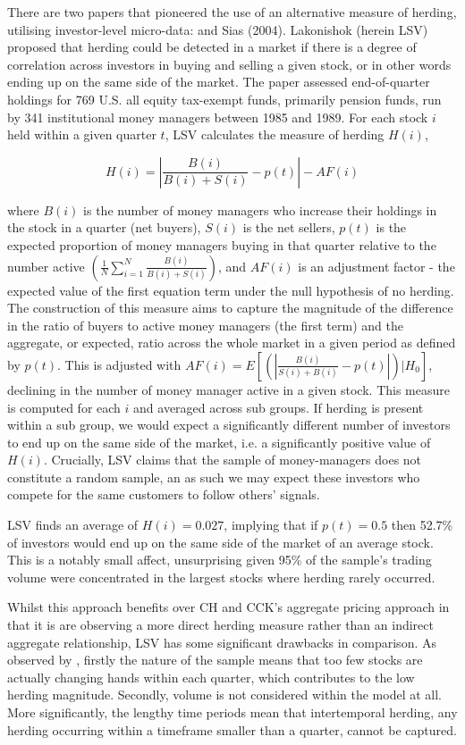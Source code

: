 \documentclass[12pt]{article}
\numberwithin{table}{section}   %
\begin{document}
There are two papers that pioneered the use of an alternative measure of herding, utilising investor-level micro-data: \citet{lakonishok} and Sias (2004). Lakonishok (herein LSV) proposed that herding could be detected in a market if there is a degree of correlation across investors in buying and selling a given stock, or in other words ending up on the same side of the market. The paper assessed end-of-quarter holdings for 769 U.S. all equity tax-exempt funds, primarily pension funds, run by 341 institutional money managers between 1985 and 1989. For each stock $i$ held within a given quarter $t$, LSV calculates the measure of herding $H(i)$,

$$
H(i)=|\frac{B(i)}{B(i)+S(i)}-p(t)|-AF(i)
$$

where $B(i)$ is the number of money managers who increase their holdings in the stock in a quarter (net buyers), $S(i)$ is the net sellers, $p(t)$ is the expected proportion of money managers buying in that quarter relative to the number active $(\frac{1}{N}\sum^N_{i=1}\frac{B(i)}{B(i)+S(i)})$, and $AF(i)$ is an adjustment factor - the expected value of the first equation term under the null hypothesis of no herding. The construction of this measure aims to capture the magnitude of the difference in the ratio of buyers to active money managers (the first term) and the aggregate, or expected, ratio across the whole market in a given period as defined by $p(t)$. This is adjusted with $AF(i)=E[(|\frac{B(i)}{S(i)+B(i)}-p(t)|)|H_0]$, declining in the number of money manager active in a given stock. This measure is computed for each $i$ and averaged across sub groups. If herding is present within a sub group, we would expect a significantly different number of investors to end up on the same side of the market, i.e. a significantly positive value of $H(i)$. Crucially, LSV claims that the sample of money-managers does not constitute a random sample, an as such we may expect these investors who compete for the same customers to follow others’ signals.

LSV finds an average of $H(i)=0.027$, implying that if $p(t)=0.5$  then 52.7\% of investors would end up on the same side of the market of an average stock. This is a notably small affect, unsurprising given 95\% of the sample’s trading volume were concentrated in the largest stocks where herding rarely occurred. 

Whilst this approach benefits over CH and CCK’s aggregate pricing approach in that it is are observing a more direct herding measure rather than an indirect aggregate relationship, LSV has some significant drawbacks in comparison. As observed by \citet{bikh-review}, firstly the nature of the sample means that too few stocks are actually changing hands within each quarter, which contributes to the low herding magnitude. Secondly, volume is not considered within the model at all. More significantly, the lengthy time periods mean that intertemporal herding, any herding occurring within a timeframe smaller than a quarter, cannot be captured.
\end{document}
